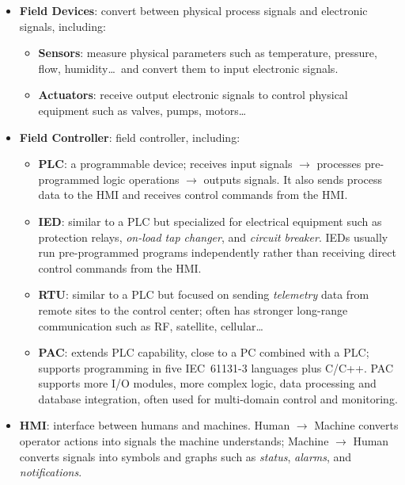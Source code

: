 \documentclass[../main.tex]{subfiles}
\begin{document}
\begin{itemize}
    \begin{itemize}
        \item \textbf{Field Devices}: convert between physical process signals and electronic signals, including:
        \begin{itemize}
            \item \textbf{Sensors}: measure physical parameters such as temperature, pressure, flow, humidity\ldots\ and convert them to input electronic signals.
            \item \textbf{Actuators}: receive output electronic signals to control physical equipment such as valves, pumps, motors\ldots
        \end{itemize}

        \item \textbf{Field Controller}: field controller, including:
        \begin{itemize}
            \item \textbf{PLC}: a programmable device; receives input signals $\rightarrow$ processes pre-programmed logic operations $\rightarrow$ outputs signals. It also sends process data to the HMI and receives control commands from the HMI.

            \item \textbf{IED}: similar to a PLC but specialized for electrical equipment such as protection relays, \textit{on-load tap changer}, and \textit{circuit breaker}. IEDs usually run pre-programmed programs independently rather than receiving direct control commands from the HMI.

            \item \textbf{RTU}: similar to a PLC but focused on sending \textit{telemetry} data from remote sites to the control center; often has stronger long-range communication such as RF, satellite, cellular\ldots

            \item \textbf{PAC}: extends PLC capability, close to a PC combined with a PLC; supports programming in five IEC~61131-3 languages plus C/C++. PAC supports more I/O modules, more complex logic, data processing and database integration, often used for multi-domain control and monitoring.
        \end{itemize}

        \item \textbf{HMI}: interface between humans and machines. Human $\rightarrow$ Machine converts operator actions into signals the machine understands; Machine $\rightarrow$ Human converts signals into symbols and graphs such as \textit{status}, \textit{alarms}, and \textit{notifications}.
    \end{itemize}


\end{itemize}
\end{document}
